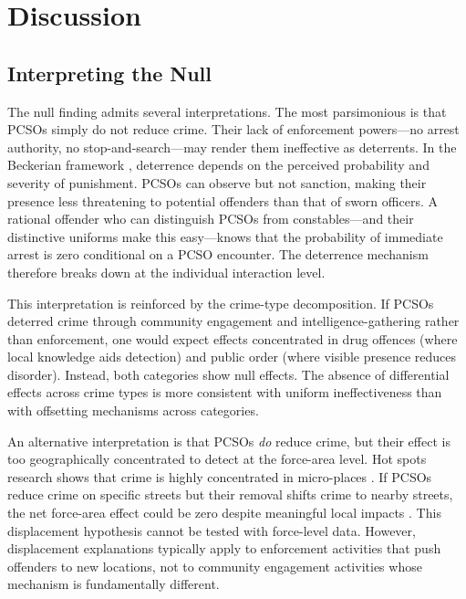 \documentclass[12pt]{article}
\begin{document}
\section{Discussion}

\subsection{Interpreting the Null}

The null finding admits several interpretations. The most parsimonious is that PCSOs simply do not reduce crime. Their lack of enforcement powers---no arrest authority, no stop-and-search---may render them ineffective as deterrents. In the Beckerian framework \citep{becker1968crime}, deterrence depends on the perceived probability and severity of punishment. PCSOs can observe but not sanction, making their presence less threatening to potential offenders than that of sworn officers. A rational offender who can distinguish PCSOs from constables---and their distinctive uniforms make this easy---knows that the probability of immediate arrest is zero conditional on a PCSO encounter. The deterrence mechanism therefore breaks down at the individual interaction level.

This interpretation is reinforced by the crime-type decomposition. If PCSOs deterred crime through community engagement and intelligence-gathering rather than enforcement, one would expect effects concentrated in drug offences (where local knowledge aids detection) and public order (where visible presence reduces disorder). Instead, both categories show null effects. The absence of differential effects across crime types is more consistent with uniform ineffectiveness than with offsetting mechanisms across categories.

An alternative interpretation is that PCSOs \textit{do} reduce crime, but their effect is too geographically concentrated to detect at the force-area level. Hot spots research shows that crime is highly concentrated in micro-places \citep{sherman1989hot, braga2019hot}. If PCSOs reduce crime on specific streets but their removal shifts crime to nearby streets, the net force-area effect could be zero despite meaningful local impacts \citep{weisburd2006does}. This displacement hypothesis cannot be tested with force-level data. However, displacement explanations typically apply to enforcement activities that push offenders to new locations, not to community engagement activities whose mechanism is fundamentally different.
\end{document}
